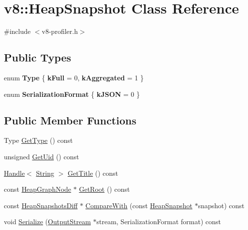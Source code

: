 \hypertarget{classv8_1_1_heap_snapshot}{}\section{v8\+:\+:Heap\+Snapshot Class Reference}
\label{classv8_1_1_heap_snapshot}


{\ttfamily \#include $<$v8-\/profiler.\+h$>$}

\subsection*{Public Types}
\begin{DoxyCompactItemize}
\item 
\hypertarget{classv8_1_1_heap_snapshot_ac199f9738b2143064af09e50a48b466d}{}enum {\bfseries Type} \{ {\bfseries k\+Full} = 0, 
{\bfseries k\+Aggregated} = 1
 \}\label{classv8_1_1_heap_snapshot_ac199f9738b2143064af09e50a48b466d}

\item 
\hypertarget{classv8_1_1_heap_snapshot_a8ed7909568af85f7a36ef5f4da4dd495}{}enum {\bfseries Serialization\+Format} \{ {\bfseries k\+J\+S\+O\+N} = 0
 \}\label{classv8_1_1_heap_snapshot_a8ed7909568af85f7a36ef5f4da4dd495}

\end{DoxyCompactItemize}
\subsection*{Public Member Functions}
\begin{DoxyCompactItemize}
\item 
Type \hyperlink{classv8_1_1_heap_snapshot_a7df9a046a19b97284105c854abf961f3}{Get\+Type} () const 
\item 
unsigned \hyperlink{classv8_1_1_heap_snapshot_a8096d1dc0b99fbffc0f0618be8472ca7}{Get\+Uid} () const 
\item 
\hyperlink{classv8_1_1_handle}{Handle}$<$ \hyperlink{classv8_1_1_string}{String} $>$ \hyperlink{classv8_1_1_heap_snapshot_a54d5d9e0234c2ee361892ea598624a82}{Get\+Title} () const 
\item 
const \hyperlink{classv8_1_1_heap_graph_node}{Heap\+Graph\+Node} $\ast$ \hyperlink{classv8_1_1_heap_snapshot_aafd7abe35ce29f9874de6687c65bf2af}{Get\+Root} () const 
\item 
const \hyperlink{classv8_1_1_heap_snapshots_diff}{Heap\+Snapshots\+Diff} $\ast$ \hyperlink{classv8_1_1_heap_snapshot_ae389ce901c547411e8bbd45a61d828cc}{Compare\+With} (const \hyperlink{classv8_1_1_heap_snapshot}{Heap\+Snapshot} $\ast$snapshot) const 
\item 
void \hyperlink{classv8_1_1_heap_snapshot_acf7383deaa06fab1d948fd7e737ac7d3}{Serialize} (\hyperlink{classv8_1_1_output_stream}{Output\+Stream} $\ast$stream, Serialization\+Format format) const 
\end{DoxyCompactItemize}


